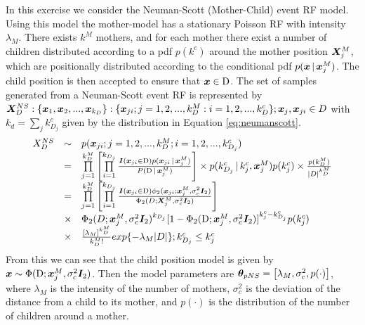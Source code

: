 \section{}
\label{sec:problem3}
In this exercise we consider the Neuman-Scott (Mother-Child) event RF model. Using this model the mother-model has a stationary Poisson RF with intensity $\lambda_M$. There exists $k^M$ mothers, and for each mother there exist a number of children distributed according to a pdf $p(k^c)$ around the mother position $\bm{X}_j^M$, which are positionally distributed according to the conditional pdf $p(\bm{x} \, | \, \bm{x}_j^M)$. The child position is then accepted to ensure that $\bm{x} \in \mathrm{D}$. The set of samples generated from a Neuman-Scott event RF is represented by $\bm{X}_D^{NS}:\{\bm{x}_1,\bm{x}_2,...,\bm{x}_{k_D}\}:\{\bm{x}_{ji};j=1,2,...,k_D^M:i = 1,2,...,k_D^c\};\bm{x}_j,\bm{x}_{ji}\in D$ with $k_d = \sum_j k_{D_j}^c$ given by the distribution in Equation \ref{eq:neumanscott}.
\begin{equation}
    \begin{array}{lll}
        X_D^{NS} & \sim & p(\bm{x}_{ji}; j = 1,2,...,k_D^M; i =1,2,...,k_{D_j}^c) \\
         & = & \prod\limits_{j=1}^{k_D^M}\left[\prod\limits_{i=1}^{k_{D_j}}\frac{ \bm{I}(\bm{x}_{ji}\in \mathrm{D})p(\bm{x}_{ji}\, | \, \bm{x}_j^M)}{ P(\mathrm{D}\, | \, \bm{x}_j^M)}\right]\times p(k_{D_j}^c\, | \, k_j^c,\bm{x}_j^M)p(k_j^c)\times \frac{p(k_D^M)}{|D|^{k_D^M}} \\
         & = & \prod\limits_{j=1}^{k_D^M}\left[\prod\limits_{i=1}^{k_{D_j}}\frac{ \bm{I}(\bm{x}_{ji}\in \mathrm{D}) \phi_2(\bm{x}_{ji};\bm{x}_j^M,\sigma_c^2\bm{I}_2)}{ \Phi_2(D;\bm{X}_j^M,\sigma_c^2\bm{I}_2 )}\right] \\
         & \times & \Phi_2(D;\bm{x}_j^M,\sigma_c^2\bm{I}_2)^{k_{D_j}}[1-\Phi_2(\mathrm{D};\bm{x}_j^M,\sigma_c^2\bm{I}_2)]^{k_j^c-k_{D_j}^c}p(k_j^c)\\
          & \times & \frac{[\lambda_M]^{k_D^M}}{k_D^M!}exp\{-\lambda_M|D|\};k_{D_j}^c\leq k_j^c
         \end{array}
    \label{eq:neumanscott}
\end{equation}
From this we can see that the child position model is given by $\bm{x} \sim \Phi(\mathrm{D};\bm{x}_j^M, \sigma_c^2\bm{I}_2)$. Then the model parameters are $\bm{\theta}_{pNS} = \left[\lambda_M,\sigma_c^2,p(\cdot)\right]$, where $\lambda_M$ is the intensity of the number of mothers, $\sigma_c^2$ is the deviation of the distance from a child to its mother, and $p(\cdot)$ is the distribution of the number of children around a mother.

